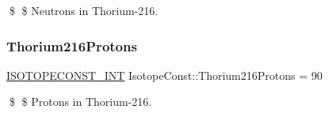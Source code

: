 \$ \$ Neutrons in Thorium-\/216. \mbox{\label{group___isotope_const-_thorium-_th216_ga92b3222bb9c561d605f95e0b7e12bfd7}} 
\subsubsection{\texorpdfstring{Thorium216\+Protons}{Thorium216Protons}}
{\footnotesize\ttfamily \mbox{\hyperlink{group___isotope_const-_macros_ga5f18360b3e99483a35c32d789e62621c}{I\+S\+O\+T\+O\+P\+E\+C\+O\+N\+S\+T\+\_\+\+I\+NT}} Isotope\+Const\+::\+Thorium216\+Protons = 90}

\$ \$ Protons in Thorium-\/216. 